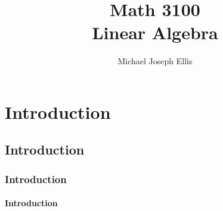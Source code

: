 \documentclass[11pt]{report}
\title{\Huge{Math 3100}\\Linear Algebra}
\author{\huge{Michael Joseph Ellis}}
\date{}
\begin{document}
\maketitle
\newpage
\tableofcontents
\pagebreak

\chapter{Introduction}

\section{Introduction}

\subsection{Introduction}

\subsubsection{Introduction}
\end{document}
